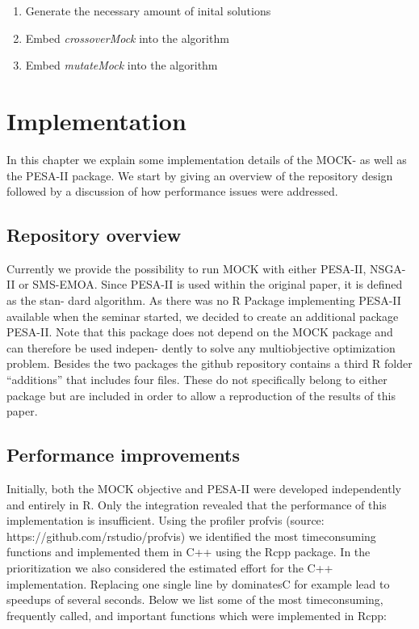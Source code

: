 \documentclass[parskip=half,DIV=14]{scrartcl}\usepackage[]{graphicx}\usepackage[]{color}
\begin{document}
\begin{enumerate}
\item  Generate the necessary amount of inital solutions
\item  Embed \textit{crossoverMock} into the algorithm
\item  Embed \textit{mutateMock} into the algorithm
\end{enumerate}

\section{Implementation}

In this chapter we explain some implementation details of the MOCK- as well as the
PESA-II package. We start by giving an overview of the repository design followed by a discussion of how performance issues were addressed.

\subsection{Repository overview}
Currently we provide the possibility to run MOCK with either PESA-II, NSGA-II or
SMS-EMOA. Since PESA-II is used within the original paper, it is defined as the stan-
dard algorithm. As there was no R Package implementing PESA-II available when the
seminar started, we decided to create an additional package PESA-II. Note that this
package does not depend on the MOCK package and can therefore be used indepen-
dently to solve any multiobjective optimization problem. Besides the two packages the github repository contains a third R folder “additions” that includes four files. These do not specifically belong to either package but are included in order to allow a reproduction of the results of this paper.

\subsection{Performance improvements}
Initially, both the MOCK objective and PESA-II were developed independently and entirely in R. Only the integration revealed that the performance of this implementation is insufficient. Using the profiler profvis (source: https://github.com/rstudio/profvis) we identified the most timeconsuming functions and implemented them in C++ using the Rcpp package. In the prioritization we also considered the estimated effort for the C++ implementation. Replacing one single line by dominatesC for example lead to speedups of several seconds. Below we list some of the most timeconsuming, frequently called, and important functions which were implemented in Rcpp:
\end{document}
